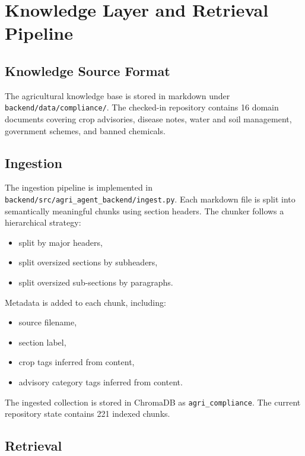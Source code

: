 \documentclass[11pt,a4paper]{article}
\begin{document}
\section{Knowledge Layer and Retrieval Pipeline}

\subsection{Knowledge Source Format}

The agricultural knowledge base is stored in markdown under \texttt{backend/data/compliance/}. The checked-in repository contains 16 domain documents covering crop advisories, disease notes, water and soil management, government schemes, and banned chemicals.

\subsection{Ingestion}

The ingestion pipeline is implemented in \texttt{backend/src/agri\_agent\_backend/ingest.py}. Each markdown file is split into semantically meaningful chunks using section headers. The chunker follows a hierarchical strategy:

\begin{itemize}
  \item split by major headers,
  \item split oversized sections by subheaders,
  \item split oversized sub-sections by paragraphs.
\end{itemize}

Metadata is added to each chunk, including:

\begin{itemize}
  \item source filename,
  \item section label,
  \item crop tags inferred from content,
  \item advisory category tags inferred from content.
\end{itemize}

The ingested collection is stored in ChromaDB as \texttt{agri\_compliance}. The current repository state contains 221 indexed chunks.

\subsection{Retrieval}
\end{document}

